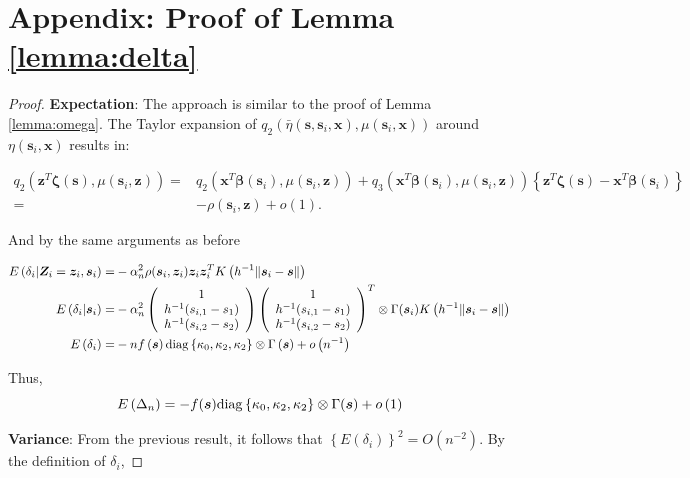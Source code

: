 \documentclass[authoryear,review, 12pt]{elsarticle}
\begin{document}
\section*{Appendix: Proof of Lemma \ref{lemma:delta}}
\begin{proof}
\textbf{Expectation}: The approach is similar to the proof of Lemma
\ref{lemma:omega}. The Taylor expansion of $q_{2}\left(\bar{\eta}\left(\bm{s},\bm{s}_{i},\bm{x}\right),\mu\left(\bm{s}_{i},\bm{x}\right)\right)$
around $\eta\left(\bm{s}_{i},\bm{x}\right)$ results in:

\begin{align*}
q_{2}\left(\bm{z}^{T}\bm{\zeta}(\bm{s}),\mu(\bm{s}_{i},\bm{z})\right)= & q_{2}\left(\bm{x}^{T}\bm{\beta}(\bm{s}_{i}),\mu(\bm{s}_{i},\bm{z})\right)+q_{3}\left(\bm{x}^{T}\bm{\beta}(\bm{s}_{i}),\mu(\bm{s}_{i},\bm{z})\right)\left\{ \bm{z}^{T}\bm{\zeta}(\bm{s})-\bm{x}^{T}\bm{\beta}(\bm{s}_{i})\right\} \\
= & -\rho\left(\bm{s}_{i},\bm{z}\right)+o\left(1\right).
\end{align*}


And by the same arguments as before

\begin{align*}
E\left(\delta_{i}|\bm{Z}_{i}=\bm{z}_{i},\bm{s}_{i}\right)= & -\alpha_{n}^{2}\rho(\bm{s}_{i},\bm{z}_{i})\bm{z}_{i}\bm{z}_{i}^{T}K\left(h^{-1}\|\bm{s}_{i}-\bm{s}\|\right)\\
E\left(\delta_{i}|\bm{s}_{i}\right)= & -\alpha_{n}^{2}\left(\begin{array}{c}
1\\
h^{-1}(s_{i,1}-s_{1})\\
h^{-1}(s_{i,2}-s_{2})
\end{array}\right)\left(\begin{array}{c}
1\\
h^{-1}(s_{i,1}-s_{1})\\
h^{-1}(s_{i,2}-s_{2})
\end{array}\right)^{T}\otimes\Gamma(\bm{s}_{i})K\left(h^{-1}\|\bm{s}_{i}-\bm{s}\|\right)\\
E\left(\delta_{i}\right)= & -nf\left(\bm{s}\right){\rm diag}\left\{ \kappa_{0},\kappa_{2},\kappa_{2}\right\} \otimes\Gamma\left(\bm{s}\right)+o\left(n^{-1}\right)
\end{align*}


Thus, 
\[
E\left(\Delta_{n}\right)=-f(\bm{s}){\rm diag}\left\{ \kappa_{0},\kappa_{2},\kappa_{2}\right\} \otimes\Gamma(\bm{s})+o\left(1\right)
\]


\textbf{Variance}: From the previous result, it follows that $\left\{ E\left(\delta_{i}\right)\right\} ^{2}=O\left(n^{-2}\right)$.
By the definition of $\delta_{i}$,


\end{proof}
\end{document}
